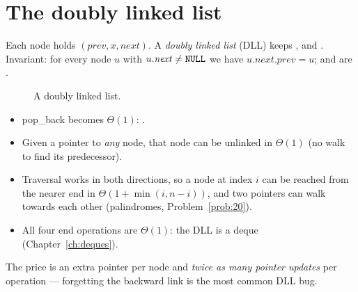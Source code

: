 \section{The doubly linked list}

\begin{definition}
Each node holds $(\mathit{prev},x,\mathit{next})$. A \emph{doubly linked list} (DLL) keeps
,  and . Invariant: for every node $u$ with
$u.\mathit{next}\ne\texttt{NULL}$ we have $u.\mathit{next}.\mathit{prev}=u$; 
and  are .
\end{definition}

\begin{figure}[ht]\centering
{}
\caption{A doubly linked list.}
\end{figure}

\begin{itemize}
\item pop\_back becomes $\Theta(1)$: .
\item Given a pointer to \emph{any} node, that node can be unlinked in $\Theta(1)$ (no walk
  to find its predecessor).
\item Traversal works in both directions, so a node at index $i$ can be reached from the
  nearer end in $\Theta(1+\min(i,n-i))$, and two pointers can walk towards each other
  (palindromes, Problem~\ref{prob:20}).
\item All four end operations are $\Theta(1)$: the DLL is a deque
  (Chapter~\ref{ch:deques}).
\end{itemize}
The price is an extra pointer per node and \emph{twice as many pointer updates} per
operation --- forgetting the backward link is the most common DLL bug.

